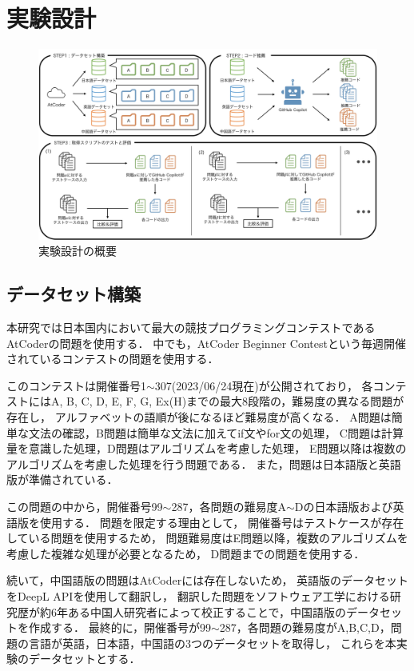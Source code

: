 \section{実験設計\label{approach}}
  \begin{figure}[t]
    \centering
    \includegraphics[width=\linewidth]{image/system.jpg}
    \caption{実験設計の概要}
    \label{experiment_design}
  \end{figure}
  
  \subsection{データセット構築\label{build_dataset}}
    本研究では日本国内において最大の競技プログラミングコンテストであるAtCoder\cite{AtCoder}の問題を使用する．
    中でも，AtCoder Beginner Contestという毎週開催されているコンテストの問題を使用する．
    
    このコンテストは開催番号1${\sim}$307(2023/06/24現在)が公開されており，
    各コンテストにはA, B, C, D, E, F, G, Ex(H)までの最大8段階の，難易度の異なる問題が存在し，
    アルファベットの語順が後になるほど難易度が高くなる．
    A問題は簡単な文法の確認，B問題は簡単な文法に加えてif文やfor文の処理，
    C問題は計算量を意識した処理，D問題はアルゴリズムを考慮した処理，
    E問題以降は複数のアルゴリズムを考慮した処理を行う問題である．
    また，問題は日本語版と英語版が準備されている．
    
    この問題の中から，開催番号99${\sim}$287，各問題の難易度A${\sim}$Dの日本語版および英語版を使用する．
    問題を限定する理由として，
    開催番号はテストケースが存在している問題を使用するため，
    問題難易度はE問題以降，複数のアルゴリズムを考慮した複雑な処理が必要となるため，
    D問題までの問題を使用する．
    
    続いて，中国語版の問題はAtCoderには存在しないため，
    英語版のデータセットをDeepL APIを使用して翻訳し，
    翻訳した問題をソフトウェア工学における研究歴が約6年ある中国人研究者によって校正することで，中国語版のデータセットを作成する．
    最終的に，開催番号が99${\sim}$287，各問題の難易度がA,B,C,D，問題の言語が英語，日本語，中国語の3つのデータセットを取得し，
    これらを本実験のデータセットとする．

